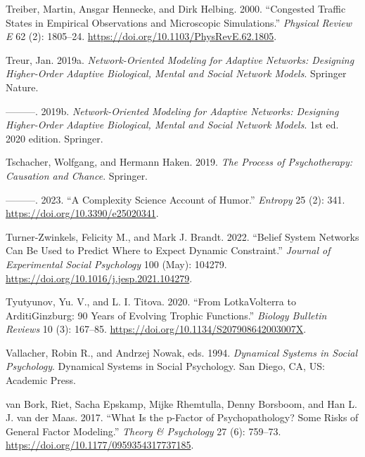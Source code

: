 \documentclass[
  a4paper,
  DIV=11,
  numbers=noendperiod]{scrreprt}
\newlength{\cslhangindent}
\newlength{\cslentryspacingunit} %
\newenvironment{CSLReferences}[2] %
 {%
  \setlength{\parindent}{0pt}
  \ifodd #1
  \let\oldpar\par
  \def\par{\hangindent=\cslhangindent\oldpar}
  \fi
  \setlength{\parskip}{#2\cslentryspacingunit}
 }%
 {}
\begin{document}
\begin{CSLReferences}{1}{0}
\leavevmode{}%
Treiber, Martin, Ansgar Hennecke, and Dirk Helbing. 2000. {``Congested
Traffic States in Empirical Observations and Microscopic Simulations.''}
\emph{Physical Review E} 62 (2): 1805--24.
\url{https://doi.org/10.1103/PhysRevE.62.1805}.

\leavevmode{}%
Treur, Jan. 2019a. \emph{Network-{Oriented Modeling} for {Adaptive
Networks}: {Designing Higher-Order Adaptive Biological}, {Mental} and
{Social Network Models}}. {Springer Nature}.

\leavevmode{}%
---------. 2019b. \emph{Network-Oriented Modeling for Adaptive Networks:
Designing Higher-Order Adaptive Biological, Mental and Social Network
Models}. 1st ed. 2020 edition. Springer.

\leavevmode{}%
Tschacher, Wolfgang, and Hermann Haken. 2019. \emph{The Process of
Psychotherapy: Causation and Chance}. Springer.

\leavevmode{}%
---------. 2023. {``A Complexity Science Account of Humor.''}
\emph{Entropy} 25 (2): 341. \url{https://doi.org/10.3390/e25020341}.

\leavevmode{}%
Turner-Zwinkels, Felicity M., and Mark J. Brandt. 2022. {``Belief System
Networks Can Be Used to Predict Where to Expect Dynamic Constraint.''}
\emph{Journal of Experimental Social Psychology} 100 (May): 104279.
\url{https://doi.org/10.1016/j.jesp.2021.104279}.

\leavevmode{}%
Tyutyunov, Yu. V., and L. I. Titova. 2020. {``From
Lotka{\textendash}Volterra to Arditi{\textendash}Ginzburg: 90 Years of
Evolving Trophic Functions.''} \emph{Biology Bulletin Reviews} 10 (3):
167--85. \url{https://doi.org/10.1134/S207908642003007X}.

\leavevmode{}%
Vallacher, Robin R., and Andrzej Nowak, eds. 1994. \emph{Dynamical
Systems in Social Psychology}. Dynamical Systems in Social Psychology.
{San Diego, CA, US}: {Academic Press}.

\leavevmode{}%
van Bork, Riet, Sacha Epskamp, Mijke Rhemtulla, Denny Borsboom, and Han
L. J. van der Maas. 2017. {``What Is the p-Factor of Psychopathology?
{Some} Risks of General Factor Modeling.''} \emph{Theory \& Psychology}
27 (6): 759--73. \url{https://doi.org/10.1177/0959354317737185}.


\end{CSLReferences}
\end{document}
